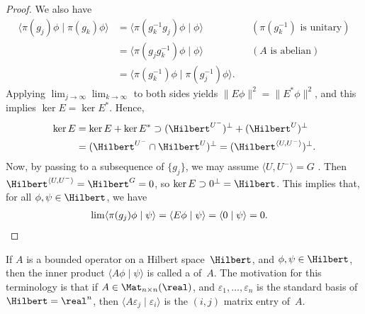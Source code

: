 \begin{proof}
We also have
\begin{align*}
 \langle \pi(g_j) \phi \mid \pi(g_k) \phi \rangle
 &= \langle \pi(g_k^{-1} g_j) \phi \mid \phi \rangle
 	&& (\text{$\pi(g_k^{-1})$ is unitary})
 \\&= \langle \pi(g_j g_k^{-1}) \phi \mid \phi \rangle
 	&& (\text{$A$ is abelian}) 
 \\&= \langle \pi(g_k^{-1}) \phi \mid \pi(g_j^{-1}) \phi \rangle
.\end{align*}
Applying $\lim_{j \to \infty} \lim_{k \to \infty}$ to both sides yields
$ \lVert E\phi\rVert^2 = \lVert E^* \phi\rVert^2 $,
 and this implies $\ker E = \ker E^* $. 
Hence, 
 \begin{align*}
 \ker E
 &= \ker E + \ker E^*
 \supset (\Hilbert^{U^-})^\perp + (\Hilbert^U)^\perp
 \\&= (\Hilbert^{U^-} \cap \Hilbert^U)^\perp
 = (\Hilbert^{\langle U, U^- \rangle})^\perp
 . \end{align*}
 Now, by passing to a subsequence of $\{g_j\}$, we may assume $\langle U, U^-
\rangle = G$ . Then $\Hilbert^{\langle U, U^- \rangle} =
\Hilbert^G = 0$,
 so $\ker E
 \supset 0^\perp
 = \Hilbert$.
 This implies that, for all $\phi,\psi \in \Hilbert$, we have
 \begin{align*}
  \lim \langle \pi(g_j) \phi \mid \psi \rangle
 = \langle E \phi \mid \psi \rangle
 = \langle 0 \mid \psi \rangle
 = 0 . & \qedhere \end{align*}
 \end{proof}

\begin{rem}
If $A$ is a bounded operator on a Hilbert space~$\Hilbert$, and $\phi,\psi \in \Hilbert$, then the inner product $\langle A \phi \mid \psi \rangle$ is called a  of~$A$. The motivation for this terminology is that if $A \in \Mat_{n \times n}(\real)$, and $\varepsilon_1,\ldots,\varepsilon_n$ is the standard basis of $\Hilbert = \real^n$, then $\langle A \varepsilon_j \mid \varepsilon_i \rangle$ is the $(i,j)$ matrix entry of~$A$. 
\end{rem}


